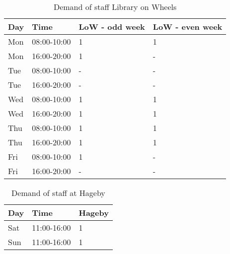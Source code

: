 \begin{table}[h]
\centering
\caption{Demand of staff  Library on Wheels}
\label{tab:LOW_Demand}
\begin{tabularx}{0.85\textwidth}{|l|l|l|X|}
\hline
\textbf{Day} & \textbf{Time} & \textbf{LoW - odd week} & \textbf{LoW - even week} 
\\ \hline 
\rowcolor{Gray} 
Mon & 08:00-10:00 & 1 & 1
\\ \hline 
\rowcolor{Gray}  
Mon & 16:00-20:00 & 1 & -
\\ \hline 
Tue & 08:00-10:00 & - & -
\\ \hline 
Tue & 16:00-20:00 & - & -
\\ \hline 
\rowcolor{Gray} 
Wed & 08:00-10:00 & 1 & 1
\\ \hline 
\rowcolor{Gray} 
Wed & 16:00-20:00 & 1 & 1
\\ \hline 
Thu & 08:00-10:00 & 1 & 1
\\ \hline 
Thu & 16:00-20:00 & 1 & 1
\\ \hline 
\rowcolor{Gray}
Fri & 08:00-10:00 & 1 & -
\\ \hline 
\rowcolor{Gray}
Fri & 16:00-20:00 & - & -
\\ \hline 
\end{tabularx}
\end{table} 

\begin{table}[h]
\centering
\caption{Demand of staff at Hageby}
\label{tab:Hageby_Demand}
\begin{tabularx}{0.5\textwidth}{|l|l|X|}
\hline
\textbf{Day} & \textbf{Time} & \textbf{Hageby}
\\ \hline 
Sat & 11:00-16:00  & 1 
\\ \hline 
Sun & 11:00-16:00  & 1 
\\ \hline 
\end{tabularx}
\end{table} 

